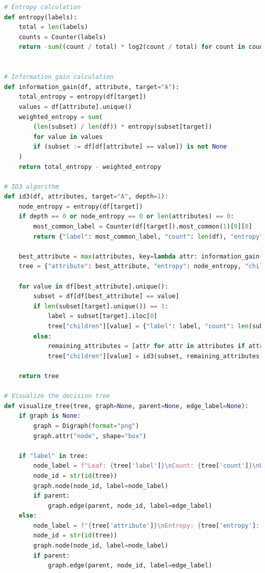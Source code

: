 \documentclass[12pt,letterpaper, onecolumn]{exam}
\begin{document}
\begin{questions}
\begin{parts}
\begin{solution}
\begin{lstlisting}[language=Python, style=mystyle]
# Entropy calculation
def entropy(labels):
    total = len(labels)
    counts = Counter(labels)
    return -sum((count / total) * log2(count / total) for count in counts.values() if count > 0)


# Information gain calculation
def information_gain(df, attribute, target="A"):
    total_entropy = entropy(df[target])
    values = df[attribute].unique()
    weighted_entropy = sum(
        (len(subset) / len(df)) * entropy(subset[target])
        for value in values
        if (subset := df[df[attribute] == value]) is not None
    )
    return total_entropy - weighted_entropy

# ID3 algorithm
def id3(df, attributes, target="A", depth=1):
    node_entropy = entropy(df[target])
    if depth == 0 or node_entropy == 0 or len(attributes) == 0:
        most_common_label = Counter(df[target]).most_common(1)[0][0]
        return {"label": most_common_label, "count": len(df), "entropy": node_entropy}

    best_attribute = max(attributes, key=lambda attr: information_gain(df, attr, target))
    tree = {"attribute": best_attribute, "entropy": node_entropy, "children": {}}

    for value in df[best_attribute].unique():
        subset = df[df[best_attribute] == value]
        if len(subset[target].unique()) == 1:
            label = subset[target].iloc[0]
            tree["children"][value] = {"label": label, "count": len(subset), "entropy": entropy(subset[target])}
        else:
            remaining_attributes = [attr for attr in attributes if attr != best_attribute]
            tree["children"][value] = id3(subset, remaining_attributes, target, depth - 1)

    return tree

# Visualize the decision tree
def visualize_tree(tree, graph=None, parent=None, edge_label=None):
    if graph is None:
        graph = Digraph(format="png")
        graph.attr("node", shape="box")

    if "label" in tree:
        node_label = f"Leaf: {tree['label']}\nCount: {tree['count']}\nEntropy: {tree['entropy']:.4f}"
        node_id = str(id(tree))
        graph.node(node_id, label=node_label)
        if parent:
            graph.edge(parent, node_id, label=edge_label)
    else:
        node_label = f"{tree['attribute']}\nEntropy: {tree['entropy']:.4f}"
        node_id = str(id(tree))
        graph.node(node_id, label=node_label)
        if parent:
            graph.edge(parent, node_id, label=edge_label)


\end{lstlisting}
\end{solution}
\end{parts}
\end{questions}
\end{document}
